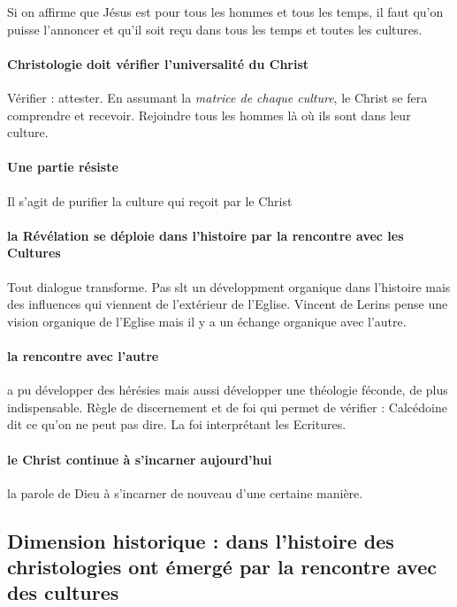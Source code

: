 \begin{Synthesis}
    Si on affirme que Jésus est pour tous les hommes et tous les temps, il faut qu'on puisse l'annoncer et qu'il soit reçu dans tous les temps et toutes les cultures.
\end{Synthesis}


\paragraph{Christologie doit vérifier l'universalité du Christ} Vérifier : attester. En assumant la \textit{matrice de chaque culture}, le Christ se fera comprendre et recevoir. Rejoindre tous les hommes là où ils sont dans leur culture. 

\paragraph{Une partie résiste} Il s'agit de purifier la culture qui reçoit par le Christ

\paragraph{la Révélation se déploie dans l'histoire par la rencontre avec les Cultures} Tout dialogue transforme. Pas slt un développment organique dans l'histoire mais des influences qui viennent de l'extérieur de l'Eglise. Vincent de Lerins pense une vision organique de l'Eglise mais il y a un échange organique avec l'autre.

\paragraph{la rencontre avec l'autre} a pu développer des hérésies mais aussi développer une théologie féconde, de plus indispensable. 
Règle de discernement et de foi qui permet de vérifier : Calcédoine dit ce qu'on ne peut pas dire. La foi interprétant les Ecritures.

\paragraph{le Christ continue à s'incarner aujourd'hui} la parole de Dieu à s'incarner de nouveau d'une certaine manière. 
 
\subsection{Dimension historique : dans l’histoire des christologies ont émergé par la rencontre
avec des cultures}

